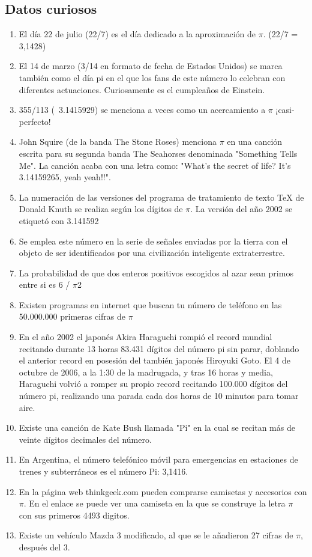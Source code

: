 \documentclass[spanish,a4paper,10pt]{article}
\begin{document}
\subsection{Datos curiosos}

\begin{enumerate}
   \item
    El día 22 de julio (22/7) es el día dedicado a la aproximación de $\pi$. (22/7 = 3,1428)
   \item
    El 14 de marzo (3/14 en formato de fecha de Estados Unidos) se marca también como el día pi en el que los fans de este número lo celebran con diferentes actuaciones. Curiosamente es el cumpleaños de Einstein.
   \item 
    355/113 (~3.1415929) se menciona a veces como un acercamiento a $\pi$ ¡casi-perfecto!
   \item
    John Squire (de la banda The Stone Roses) menciona $\pi$ en una canción escrita para su segunda banda The Seahorses denominada "Something Tells Me". La canción acaba con una letra como: "What's the secret of life? It's 3.14159265, yeah yeah!!".
   \item 
    La numeración de las versiones del programa de tratamiento de texto TeX de Donald Knuth se realiza según los dígitos de $\pi$. La versión del año 2002 se etiquetó con 3.141592
   \item
    Se emplea este número en la serie de señales enviadas por la tierra con el objeto de ser identificados por una civilización inteligente extraterrestre.
   \item
    La probabilidad de que dos enteros positivos escogidos al azar sean primos entre si es 6 / $\pi$2
   \item
    Existen programas en internet que buscan tu número de teléfono en las 50.000.000 primeras cifras de $\pi$
   \item 
    En el año 2002 el japonés Akira Haraguchi rompió el record mundial recitando durante 13 horas 83.431 dígitos del número pi sin parar, doblando el anterior record en posesión del también japonés Hiroyuki Goto. El 4 de octubre de 2006, a la 1:30 de la madrugada, y tras 16 horas y media, Haraguchi volvió a romper su propio record recitando 100.000 dígitos del número pi, realizando una parada cada dos horas de 10 minutos para tomar aire.
   \item 
     Existe una canción de Kate Bush llamada "Pi" en la cual se recitan más de veinte dígitos decimales del número.
   \item 
     En Argentina, el número telefónico móvil para emergencias en estaciones de trenes y subterráneos es el número Pi: 3,1416.
   \item 
     En la página web thinkgeek.com pueden comprarse camisetas y accesorios con $\pi$. En el enlace se puede ver una camiseta en la que se construye la letra $\pi$ con sus primeros 4493 digitos.
   \item 
     Existe un vehículo Mazda 3 modificado, al que se le añadieron 27 cifras de $\pi$, después del 3.
 \cite{URL:XML}
   
 \end{enumerate}








\nocite{*}
\end{document}
